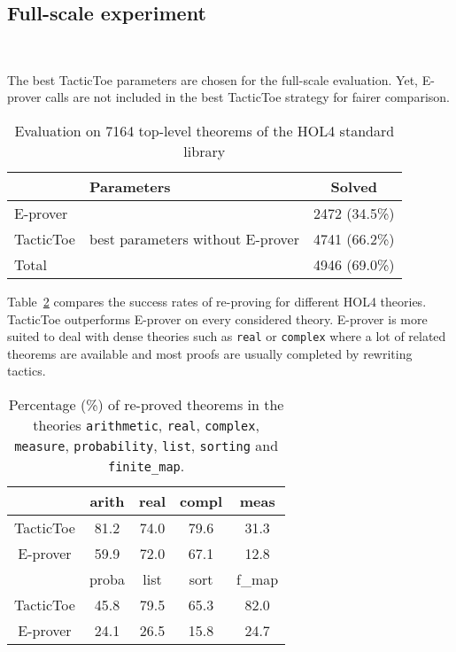 \documentclass[runningheads,a4paper,draft]{svjour3}
\def\holfour{\textsf{HOL4}\xspace}
\def\eprover{\textsf{E-prover}\xspace}
\def\tactictoe{\textsf{TacticToe}\xspace}
\newcommand{\ra}[1]{\renewcommand{\arraystretch}{#1}}
\begin{document}
\subsection{Full-scale experiment}~\label{sec:full_exp} 


The best \tactictoe parameters are chosen for the full-scale evaluation. Yet,
\eprover calls are not included in the best \tactictoe strategy for fairer 
comparison.

\begin{table}[h!]
\centering\ra{1.3}
\small
\begin{tabular}{llc}
\toprule
  & Parameters & Solved \\
\midrule
   \eprover   & & 2472 (34.5\%)\\ 
   \tactictoe & best parameters without \eprover & 4741 (66.2\%)\\
\midrule
   Total  &              & 4946 (69.0\%)\\
\bottomrule
\end{tabular}
\caption{Evaluation on 7164 top-level theorems of the \holfour standard library 
\label{tab:_param}}
\end{table}

Table~\ref{theories} compares the success rates of re-proving for different
\holfour theories. \tactictoe outperforms \eprover on every 
considered theory.
\eprover is more suited to deal with dense theories such as 
\texttt{real} or \texttt{complex} where a lot of related theorems are available 
and most proofs are usually completed by rewriting tactics.

\begin{table}[]
\centering
\setlength{\tabcolsep}{3mm}
\begin{tabular}{@{}ccccc@{}}
\toprule
\phantom{ab} & {arith} & {real} & {compl} & {meas} \\
\midrule
\tactictoe & 81.2 & 74.0 & 79.6 & 31.3\\
\eprover & 59.9 & 72.0 & 67.1 & 12.8\\
\midrule
\phantom{abc} & {proba} & {list} & {sort} & {f\_map} \\
\midrule
\tactictoe & 45.8 & 79.5 & 65.3 & 82.0 \\
\eprover & 24.1 & 26.5 & 15.8 & 24.7 \\
\bottomrule
\end{tabular}
\caption{\label{theories}Percentage (\%) of re-proved theorems in the theories 
\texttt{arithmetic}, \texttt{real}, \texttt{complex}, \texttt{measure},  
\texttt{probability}, \texttt{list}, \texttt{sorting} and \texttt{finite\_map}. 
}
\end{table}  
\end{document}
